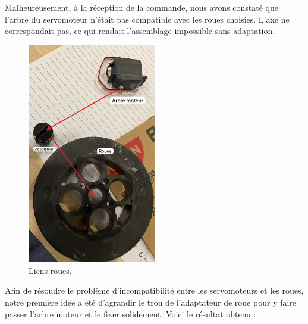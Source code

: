 \documentclass[a4paper,12pt]{report}  %
\begin{document}
Malheureusement, à la réception de la commande, nous avons constaté que l’arbre du servomoteur n’était pas compatible avec les roues choisies. L’axe ne correspondait pas, ce qui rendait l’assemblage impossible sans adaptation.

\begin{figure}[H]
	\centering
	\includegraphics[width=0.5\textwidth]{./attachments/liens_roues.png}
	\caption{Liens roues.}
\end{figure}

Afin de résoudre le problème d’incompatibilité entre les servomoteurs et les roues, notre première idée a été d’agrandir le trou de l’adaptateur de roue pour y faire passer l’arbre moteur et le fixer solidement. Voici le résultat obtenu :
\end{document}
